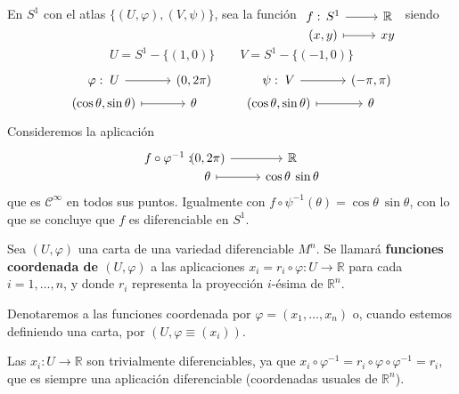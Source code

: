 \begin{ejem}
En $S^1$ con el atlas $\{(U,\varphi),(V,\psi)\}$, sea la función $\begin{tikzcd} \, \\[-5mm]
f:\,S^1 \rar & \mathbb{R}\\[-7mm]
(x,y) \arrow[mapsto]{r} & xy
\end{tikzcd}$ siendo
$$U = S^1 - \{(1,0)\} \qquad V = S^1 - \{(-1,0)\}$$
$$\begin{tikzcd}
\varphi: \; U \rar & (0,2\pi)\\[-6mm]
(\cos\theta, \sin\theta) \arrow[mapsto]{r} & \theta
\end{tikzcd} \qquad \begin{tikzcd}
\psi: \; V \rar & (-\pi,\pi)\\[-6mm]
(\cos\theta, \sin\theta) \arrow[mapsto]{r} & \theta
\end{tikzcd}$$
Consideremos la aplicación $$\begin{tikzcd}
f \circ \varphi^{-1}:\hspace{-12mm} & (0,2\pi) \rar & \mathbb{R}\\[-7mm]
& \theta \arrow[mapsto]{r} & \cos\theta\:\sin\theta
\end{tikzcd}$$ que es $\mathcal{C}^{\infty}$ en todos sus puntos. Igualmente con $f \circ \psi^{-1}(\theta) = \cos\theta\:\sin\theta$, con lo que se concluye que $f$ es diferenciable en $S^1$.
\end{ejem}

\begin{defi}
Sea $(U,\varphi)$ una carta de una variedad diferenciable $M^n$. Se llamará \textbf{funciones coordenada de $(U,\varphi)$} a las aplicaciones $x_i = r_i \circ \varphi : U \to \mathbb{R}$ para cada $i= 1,\dots,n$, y donde $r_i$ representa la proyección $i$-ésima de $\mathbb{R}^n$.
\end{defi}

\begin{nota}
Denotaremos a las funciones coordenada por $\varphi = (x_1,\dots,x_n)$ o, cuando estemos definiendo una carta, por $(U,\varphi\equiv(x_i))$.
\end{nota}

\begin{obs}
Las $x_i:U \to \mathbb{R}$ son trivialmente diferenciables, ya que $x_i \circ \varphi^{-1} = r_i \circ \varphi \circ \varphi^{-1} = r_i$, que es siempre una aplicación diferenciable (coordenadas usuales de $\mathbb{R}^n$).
\end{obs}


